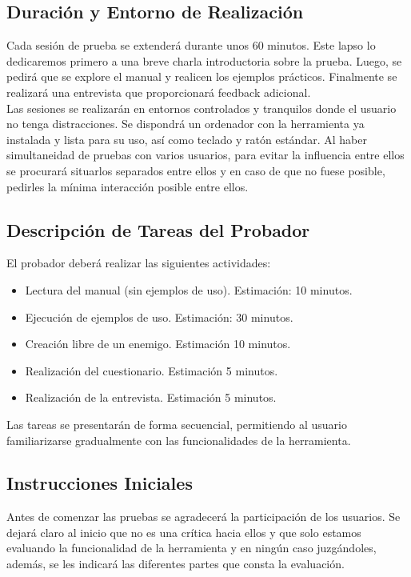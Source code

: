 \subsection{Duración y Entorno de Realización}
Cada sesión de prueba se extenderá durante unos 60 minutos. Este lapso lo dedicaremos primero a una breve charla introductoria sobre la prueba. Luego, se pedirá que se explore el manual y realicen los ejemplos prácticos. Finalmente se realizará una entrevista que proporcionará feedback adicional.\\

Las sesiones se realizarán en entornos controlados y tranquilos donde el usuario no tenga distracciones. Se dispondrá un ordenador con la herramienta ya instalada y lista para su uso, así como teclado y ratón estándar. Al haber simultaneidad de pruebas con varios usuarios, para evitar la influencia entre ellos se procurará situarlos separados entre ellos y en caso de que no fuese posible, pedirles la mínima interacción posible entre ellos.

\subsection{Descripción de Tareas del Probador}
El probador deberá realizar las siguientes actividades:

\begin{itemize}
\item Lectura del manual (sin ejemplos de uso). Estimación: 10 minutos.
\item Ejecución de ejemplos de uso. Estimación: 30 minutos.
\item Creación libre de un enemigo. Estimación 10 minutos.
\item Realización del cuestionario. Estimación 5 minutos.
\item Realización de la entrevista. Estimación 5 minutos.
\end{itemize}

Las tareas se presentarán de forma secuencial, permitiendo al usuario familiarizarse gradualmente con las funcionalidades de la herramienta. 

\subsection{Instrucciones Iniciales}

Antes de comenzar las pruebas se agradecerá la participación de los usuarios. Se dejará claro al inicio que no es una crítica hacia ellos y que solo estamos evaluando la funcionalidad de la herramienta y en ningún caso juzgándoles, además, se les indicará las diferentes partes que consta la evaluación.\\

